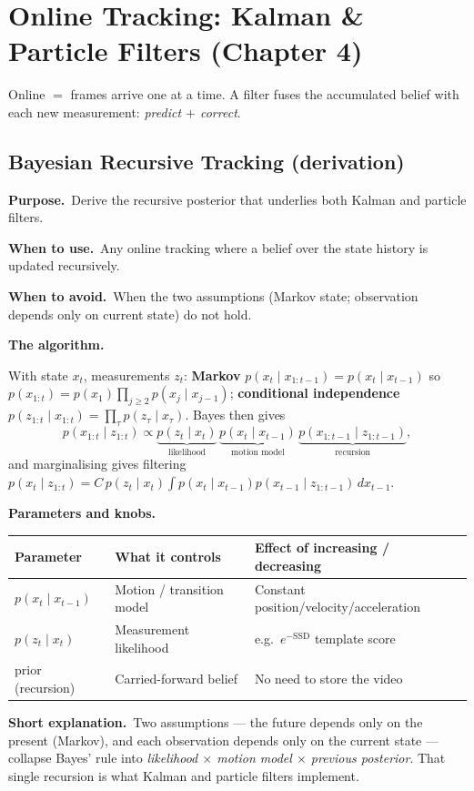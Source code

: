 \documentclass[10pt]{article}
\makeatletter
\newcommand{\Purpose}{\par\smallskip\textbf{Purpose.}\ }
\newcommand{\WhenUse}{\par\textbf{When to use.}\ }
\newcommand{\WhenAvoid}{\par\textbf{When to avoid.}\ }
\newcommand{\TheAlgo}{\par\smallskip\textbf{The algorithm.}\par\nopagebreak}
\newcommand{\Knobs}{\par\smallskip\textbf{Parameters and knobs.}\par\nopagebreak}
\newcommand{\ShortExp}{\par\smallskip\textbf{Short explanation.}\ }
\newenvironment{ptable}{\begin{center}\small\begin{tabular}{@{}p{2.5cm} p{5.9cm} p{6.2cm}@{}}\toprule
Parameter & What it controls & Effect of increasing / decreasing \\ \midrule}
{\bottomrule\end{tabular}\end{center}}
\makeatother
\begin{document}
\newpage
\section{Online Tracking: Kalman \& Particle Filters (Chapter 4)}
Online $=$ frames arrive one at a time. A filter fuses the accumulated belief with each new measurement:
\emph{predict $+$ correct}.

\subsection{Bayesian Recursive Tracking (derivation)}\label{sub:bayes}
\Purpose Derive the recursive posterior that underlies both Kalman and particle filters.
\WhenUse Any online tracking where a belief over the state history is updated recursively.
\WhenAvoid When the two assumptions (Markov state; observation depends only on current state) do not hold.
\TheAlgo With state $x_t$, measurements $z_t$: \textbf{Markov} $p(x_t\mid x_{1:t-1})=p(x_t\mid x_{t-1})$
so $p(x_{1:t})=p(x_1)\prod_{j\ge2}p(x_j\mid x_{j-1})$; \textbf{conditional independence}
$p(z_{1:t}\mid x_{1:t})=\prod_\tau p(z_\tau\mid x_\tau)$. Bayes then gives
\[
p(x_{1:t}\mid z_{1:t})\propto
\underbrace{p(z_t\mid x_t)}_{\text{likelihood}}\,
\underbrace{p(x_t\mid x_{t-1})}_{\text{motion model}}\,
\underbrace{p(x_{1:t-1}\mid z_{1:t-1})}_{\text{recursion}},
\]
and marginalising gives filtering
$p(x_t\mid z_{1:t})=C\,p(z_t\mid x_t)\!\int p(x_t\mid x_{t-1})p(x_{t-1}\mid z_{1:t-1})\,dx_{t-1}$.
\Knobs
\begin{ptable}
$p(x_t\mid x_{t-1})$ & Motion / transition model & Constant position/velocity/acceleration \\
$p(z_t\mid x_t)$ & Measurement likelihood & e.g.\ $e^{-\text{SSD}}$ template score \\
prior (recursion) & Carried-forward belief & No need to store the video \\
\end{ptable}
\ShortExp Two assumptions --- the future depends only on the present (Markov), and each observation
depends only on the current state --- collapse Bayes' rule into \emph{likelihood $\times$ motion model
$\times$ previous posterior}. That single recursion is what Kalman and particle filters implement.

\end{document}
